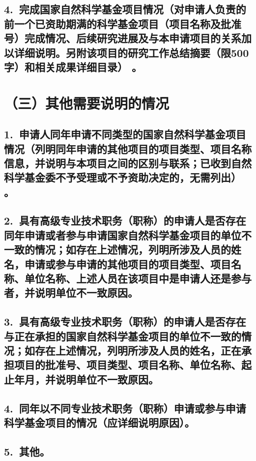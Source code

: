 \documentclass[12pt,UTF8,AutoFakeBold=2.5,a4paper]{ctexart} %
\begin{document}


\subsection{\hspace{1.45em}  4.~{\bfseries 完成国家自然科学基金项目情况}（对申请人负责的前一个已资助期满的科学基金项目（项目名称及批准号）完成情况、后续研究进展及与本申请项目的关系加以详细说明。另附该项目的研究工作总结摘要（限500字）和相关成果详细目录）\hspace{-14pt} 。}




\section{{\bfseries （三）其他需要说明的情况}} %

\subsection{\hspace{1.45em}  1.~申请人同年申请不同类型的国家自然科学基金项目情况（列明同年申请的其他项目的项目类型、项目名称信息，并说明与本项目之间的区别与联系；已收到自然科学基金委不予受理或不予资助决定的，无需列出）\hspace{-14pt} 。}




\subsection{\hspace{1.45em}  2.~具有高级专业技术职务（职称）的申请人是否存在同年申请或者参与申请国家自然科学基金项目的单位不一致的情况；如存在上述情况，列明所涉及人员的姓名，申请或参与申请的其他项目的项目类型、项目名称、单位名称、上述人员在该项目中是申请人还是参与者，并说明单位不一致原因。}



\subsection{\hspace{1.45em}  3.~具有高级专业技术职务（职称）的申请人是否存在与正在承担的国家自然科学基金项目的单位不一致的情况；如存在上述情况，列明所涉及人员的姓名，正在承担项目的批准号、项目类型、项目名称、单位名称、起止年月，并说明单位不一致原因。}




\subsection{\hspace{1.45em}  4.~同年以不同专业技术职务（职称）申请或参与申请科学基金项目的情况（应详细说明原因）。}




\subsection{\hspace{1.45em}  5.~其他。}



\clearpage
\end{document}
